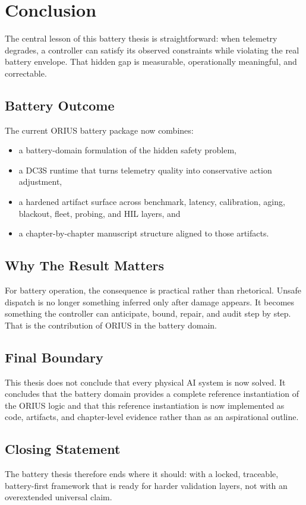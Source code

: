 \chapter{Conclusion}
\label{ch:conclusion-battery}

The central lesson of this battery thesis is straightforward: when telemetry
degrades, a controller can satisfy its observed constraints while violating
the real battery envelope.  That hidden gap is measurable, operationally
meaningful, and correctable.

\section{Battery Outcome}

The current ORIUS battery package now combines:

\begin{itemize}
  \item a battery-domain formulation of the hidden safety problem,
  \item a DC3S runtime that turns telemetry quality into conservative action
    adjustment,
  \item a hardened artifact surface across benchmark, latency, calibration,
    aging, blackout, fleet, probing, and HIL layers, and
  \item a chapter-by-chapter manuscript structure aligned to those artifacts.
\end{itemize}

\section{Why The Result Matters}

For battery operation, the consequence is practical rather than rhetorical.
Unsafe dispatch is no longer something inferred only after damage appears.
It becomes something the controller can anticipate, bound, repair, and audit
step by step.  That is the contribution of ORIUS in the battery domain.

\section{Final Boundary}

This thesis does not conclude that every physical AI system is now solved.
It concludes that the battery domain provides a complete reference
instantiation of the ORIUS logic and that this reference instantiation is now
implemented as code, artifacts, and chapter-level evidence rather than as an
aspirational outline.

\section{Closing Statement}

The battery thesis therefore ends where it should: with a locked,
traceable, battery-first framework that is ready for harder validation
layers, not with an overextended universal claim.
